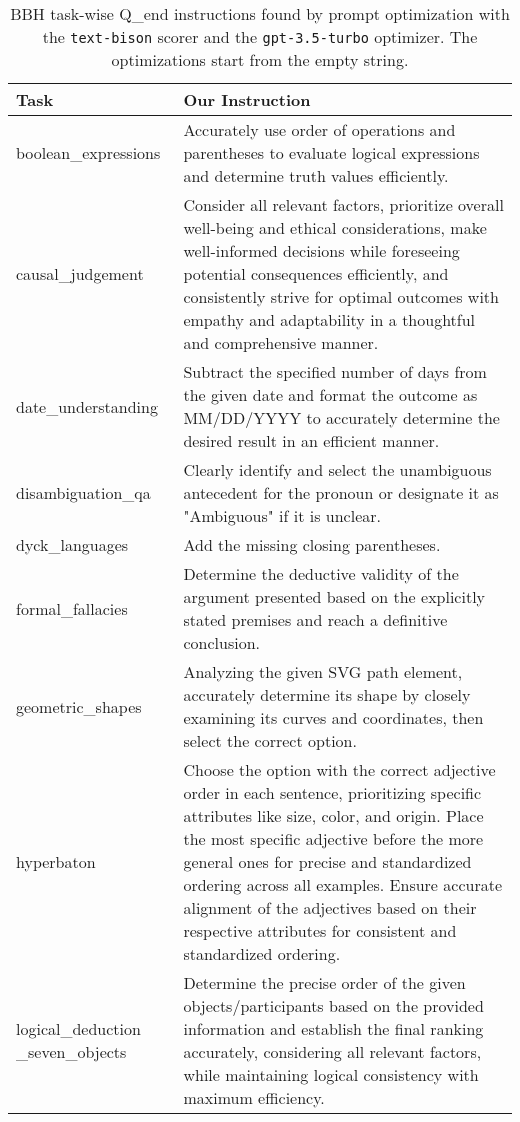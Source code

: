 \newpage
\begin{table}[H]
\scriptsize
\caption{BBH task-wise Q\_end instructions found by prompt optimization with the \texttt{text-bison} scorer and the \texttt{gpt-3.5-turbo} optimizer.
The optimizations start from the empty string.
}
\begin{center}
\begin{tabular}{P{2.3cm}P{11.6cm}}
\toprule
Task & Our Instruction \\
\midrule
boolean\_expressions & Accurately use order of operations and parentheses to evaluate logical expressions and determine truth values efficiently. \\ [2ex]
causal\_judgement & Consider all relevant factors, prioritize overall well-being and ethical considerations, make well-informed decisions while foreseeing potential consequences efficiently, and consistently strive for optimal outcomes with empathy and adaptability in a thoughtful and comprehensive manner. \\ [2ex]
date\_understanding & Subtract the specified number of days from the given date and format the outcome as MM/DD/YYYY to accurately determine the desired result in an efficient manner. \\ [2ex]
disambiguation\_qa & Clearly identify and select the unambiguous antecedent for the pronoun or designate it as "Ambiguous" if it is unclear. \\ [2ex]
dyck\_languages & Add the missing closing parentheses. \\ [2ex]
formal\_fallacies & Determine the deductive validity of the argument presented based on the explicitly stated premises and reach a definitive conclusion. \\ [2ex]
geometric\_shapes & Analyzing the given SVG path element, accurately determine its shape by closely examining its curves and coordinates, then select the correct option. \\ [2ex]
hyperbaton & Choose the option with the correct adjective order in each sentence, prioritizing specific attributes like size, color, and origin. Place the most specific adjective before the more general ones for precise and standardized ordering across all examples. Ensure accurate alignment of the adjectives based on their respective attributes for consistent and standardized ordering. \\ [2ex]
logical\_deduction \_seven\_objects & Determine the precise order of the given objects/participants based on the provided information and establish the final ranking accurately, considering all relevant factors, while maintaining logical consistency with maximum efficiency. \\ [2ex]

\end{tabular}
\end{center}
\end{table}
